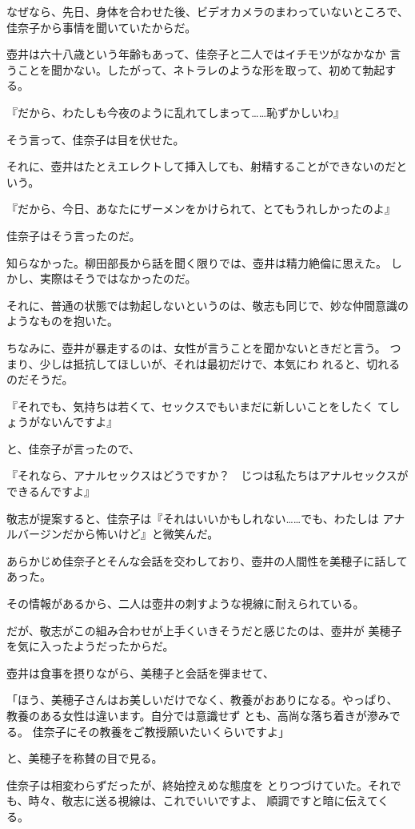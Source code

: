﻿\documentclass[
    book,tate,
    line_length=30zw,
    jafontsize=12pt,
    paper=b5j,
    landscape,
    ]{jlreq}
\begin{document}
なぜなら、先日、身体を合わせた後、ビデオカメラのまわっていないところで、
佳奈子から事情を聞いていたからだ。

壺井は六十八歳という年齢もあって、佳奈子と二人ではイチモツがなかなか
言うことを聞かない。したがって、ネトラレのような形を取って、初めて勃起する。

『だから、わたしも今夜のように乱れてしまって……恥ずかしいわ』

そう言って、佳奈子は目を伏せた。

それに、壺井はたとえエレクトして挿入しても、射精することができないのだという。

『だから、今日、あなたにザーメンをかけられて、とてもうれしかったのよ』

佳奈子はそう言ったのだ。

知らなかった。柳田部長から話を聞く限りでは、壺井は精力絶倫に思えた。
しかし、実際はそうではなかったのだ。

それに、普通の状態では勃起しないというのは、敬志も同じで、妙な仲間意識の
ようなものを抱いた。

ちなみに、壺井が暴走するのは、女性が言うことを聞かないときだと言う。
つまり、少しは抵抗してほしいが、それは最初だけで、本気にわ
れると、切れるのだそうだ。

『それでも、気持ちは若くて、セックスでもいまだに新しいことをしたく
てしょうがないんですよ』

と、佳奈子が言ったので、

『それなら、アナルセックスはどうですか？　じつは私たちはアナルセックスが
できるんですよ』

敬志が提案すると、佳奈子は『それはいいかもしれない……でも、わたしは
アナルバージンだから怖いけど』と微笑んだ。

あらかじめ佳奈子とそんな会話を交わしており、壺井の人間性を美穂子に話してあった。

その情報があるから、二人は壺井の刺すような視線に耐えられている。

だが、敬志がこの組み合わせが上手くいきそうだと感じたのは、壺井が
美穂子を気に入ったようだったからだ。

壺井は食事を摂りながら、美穂子と会話を弾ませて、

「ほう、美穂子さんはお美しいだけでなく、教養がおありになる。やっぱり、
教養のある女性は違います。自分では意識せず とも、高尚な落ち着きが滲みでる。
佳奈子にその教養をご教授願いたいくらいですよ」

と、美穂子を称賛の目で見る。

佳奈子は相変わらずだったが、終始控えめな態度を
とりつづけていた。それでも、時々、敬志に送る視線は、これでいいですよ、
順調ですと暗に伝えてくる。
\end{document}
